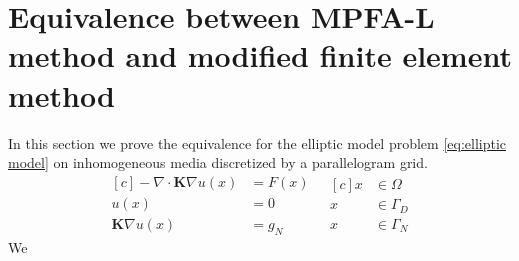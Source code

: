 \documentclass[../Main/main.tex]{subfiles}
\begin{document}
	\section*{Equivalence between MPFA-L method and modified finite element method}
	In this section we prove the equivalence for the elliptic model problem \eqref{eq:elliptic model} on inhomogeneous media discretized by a parallelogram grid.
	\begin{equation}\label{eq:elliptic model}
		\begin{aligned}[c]
			- \nabla \cdot \pmb{K} \nabla u(x) &= F(x) \\
			u(x) &= 0 \\
			\pmb{K}\nabla u(x) &= g_N
		\end{aligned}
		\ \ \
		\begin{aligned}[c]
			x &\in \Omega  \\
			x &\in \Gamma_D \\
			x &\in \Gamma_N
		\end{aligned}
	\end{equation}	
	We 
	
\end{document}
